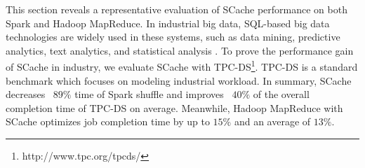 {\color{black}
This section reveals a representative evaluation of SCache performance on both Spark and Hadoop MapReduce.
In industrial big data, SQL-based big data technologies are widely used in these systems, such as data mining, predictive analytics, text analytics, and statistical analysis \cite{poess2017analysis}.
To prove the performance gain of SCache in industry, 
we evaluate SCache with TPC-DS\footnote{http://www.tpc.org/tpcds/}.
TPC-DS is a standard benchmark which focuses on modeling industrial workload.
In summary, SCache decreases ~$89\%$ time of Spark shuffle and improves ~$40\%$ of the overall completion time of TPC-DS on average.
Meanwhile, Hadoop MapReduce with SCache optimizes job completion time by up to $15\%$ and an average of $13\%$.
}


